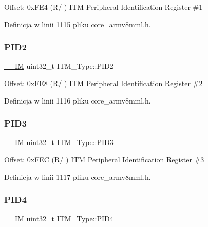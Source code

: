 Offset\+: 0x\+F\+E4 (R/ ) I\+TM Peripheral Identification Register \#1 

Definicja w linii 1115 pliku core\+\_\+armv8mml.\+h.

\mbox{\label{struct_i_t_m___type_a8471c4d77b7107cf580587509da69f38}} 
\subsubsection{\texorpdfstring{P\+I\+D2}{PID2}}
{\footnotesize\ttfamily \hyperlink{core__sc300_8h_a4cc1649793116d7c2d8afce7a4ffce43}{\+\_\+\+\_\+\+IM} uint32\+\_\+t I\+T\+M\+\_\+\+Type\+::\+P\+I\+D2}

Offset\+: 0x\+F\+E8 (R/ ) I\+TM Peripheral Identification Register \#2 

Definicja w linii 1116 pliku core\+\_\+armv8mml.\+h.

\mbox{\label{struct_i_t_m___type_af317d5e2d946d70e6fb67c02b92cc8a3}} 
\subsubsection{\texorpdfstring{P\+I\+D3}{PID3}}
{\footnotesize\ttfamily \hyperlink{core__sc300_8h_a4cc1649793116d7c2d8afce7a4ffce43}{\+\_\+\+\_\+\+IM} uint32\+\_\+t I\+T\+M\+\_\+\+Type\+::\+P\+I\+D3}

Offset\+: 0x\+F\+EC (R/ ) I\+TM Peripheral Identification Register \#3 

Definicja w linii 1117 pliku core\+\_\+armv8mml.\+h.

\mbox{\label{struct_i_t_m___type_aad5e11dd4baf6d941bd6c7450f60a158}} 
\subsubsection{\texorpdfstring{P\+I\+D4}{PID4}}
{\footnotesize\ttfamily \hyperlink{core__sc300_8h_a4cc1649793116d7c2d8afce7a4ffce43}{\+\_\+\+\_\+\+IM} uint32\+\_\+t I\+T\+M\+\_\+\+Type\+::\+P\+I\+D4}

